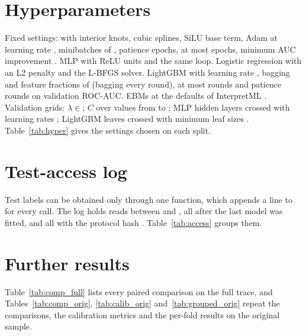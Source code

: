 \section{Hyperparameters}
\label{app:hyper}

Fixed settings: \kaam{} with  interior knots, cubic splines, SiLU base term, Adam at learning rate , minibatches of , patience  epochs, at most  epochs, minimum AUC improvement . MLP with ReLU units and the same loop. Logistic regression with an L2 penalty and the L-BFGS solver. LightGBM with learning rate , bagging and feature fractions of  (bagging every round), at most  rounds and patience  rounds on validation ROC-AUC. EBMs at the defaults of InterpretML . Validation grids: $\lambda\in$; $C$ over  values from  to ; MLP hidden layers  crossed with learning rates ; LightGBM leaves  crossed with minimum leaf sizes . Table~\ref{tab:hyper} gives the settings chosen on each split.



\section{Test-access log}
\label{app:access}

Test labels can be obtained only through one function, which appends a line to  for every call. The log holds  reads between  and , all after the last model was fitted, and all with the protocol hash . Table~\ref{tab:access} groups them.



\section{Further results}
\label{app:more}

Table~\ref{tab:comp_full} lists every paired comparison on the full trace, and Tables~\ref{tab:comp_orig}, \ref{tab:calib_orig} and~\ref{tab:grouped_orig} repeat the comparisons, the calibration metrics and the per-fold results on the original sample.





